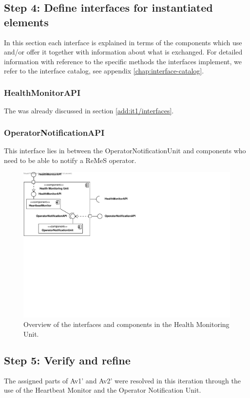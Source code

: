\subsection{Step 4: Define interfaces for instantiated elements}
\label{add:it9/interfaces}

\npar In this section each interface is explained in terms of the components
which use and/or offer it together with information about what is exchanged. For
detailed information with reference to the specific methods the interfaces
implement, we refer to the interface catalog, see appendix
\ref{chap:interface-catalog}.

\subsubsection{HealthMonitorAPI}

\npar The  was already discussed in section
\ref{add:it1/interfaces}.

\subsubsection{OperatorNotificationAPI}
\npar This interface lies in between the OperatorNotificationUnit and components
who need to be able to notify a ReMeS operator. 

\begin{figure}[H]
	\begin{centering}
		\includegraphics[width=\textwidth]{figs/add-it9-interfaces.pdf}
		\caption{Overview of the interfaces and components in the Health Monitoring
		Unit.}
		\label{fig:it9/interfaces}
	\end{centering}
\end{figure}

\subsection{Step 5: Verify and refine}
\label{add:it9/verification}

\npar The assigned parts of Av1' and Av2' were resolved in this iteration
through the use of the Heartbeat Monitor and the Operator Notification Unit.
